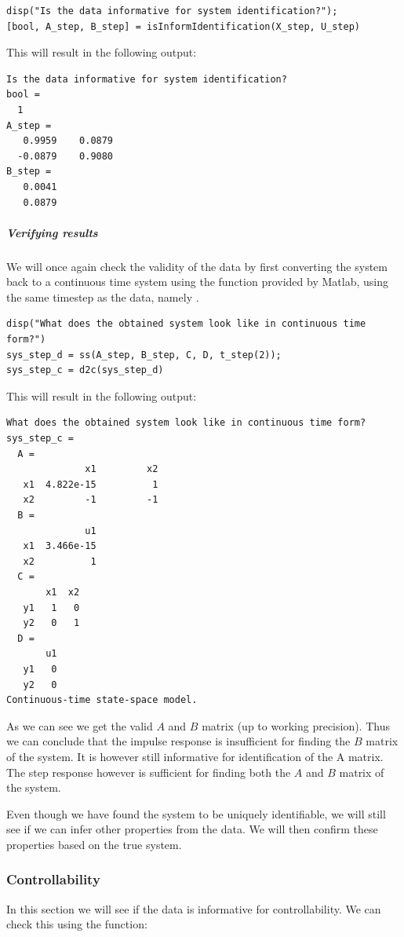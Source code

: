 \begin{lstlisting}
disp("Is the data informative for system identification?");
[bool, A_step, B_step] = isInformIdentification(X_step, U_step)
\end{lstlisting}

This will result in the following output:

\begin{verbatim}
Is the data informative for system identification?
bool =
  1
A_step =
   0.9959    0.0879
  -0.0879    0.9080
B_step =
   0.0041
   0.0879
\end{verbatim}

\subparagraph{Verifying results}
We will once again check the validity of the data by first converting the system back to a continuous time system using the  function provided by Matlab, using the same timestep as the data, namely .

\begin{lstlisting}
disp("What does the obtained system look like in continuous time form?")
sys_step_d = ss(A_step, B_step, C, D, t_step(2));
sys_step_c = d2c(sys_step_d)
\end{lstlisting}

This will result in the following output:

\begin{verbatim}
What does the obtained system look like in continuous time form?
sys_step_c =
  A = 
              x1         x2
   x1  4.822e-15          1
   x2         -1         -1
  B = 
              u1
   x1  3.466e-15
   x2          1
  C = 
       x1  x2
   y1   1   0
   y2   0   1
  D = 
       u1
   y1   0
   y2   0
Continuous-time state-space model.
\end{verbatim}

As we can see we get the valid $A$ and $B$ matrix (up to working precision). Thus we can conclude that the impulse response is insufficient for finding the $B$ matrix of the system. It is however still informative for identification of the A matrix. The step response however is sufficient for finding both the $A$ and $B$ matrix of the system.

Even though we have found the system to be uniquely identifiable, we will still see if we can infer other properties from the data. We will then confirm these properties based on the true system.

\subsubsection{Controllability}
In this section we will see if the data is informative for controllability. We can check this using the function:
\begin{center}
\end{center} 

